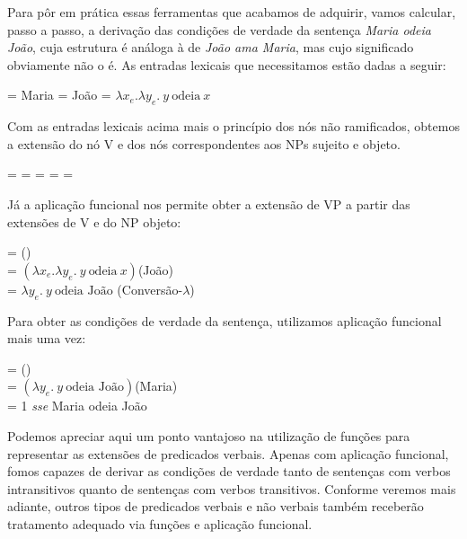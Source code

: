 Para pôr em prática essas ferramentas que acabamos de adquirir, vamos
calcular, passo a passo, a derivação das condições de
verdade da sentença \textit{Maria odeia João}, cuja estrutura é análoga
à de \textit{João ama Maria}, mas cujo significado obviamente não o é.
As entradas lexicais que necessitamos estão dadas a seguir:

\begin{exe}
	\ex 
	\begin{xlist}
		\ex{} = Maria
		\ex {} = João
		\ex {} = $\lambda x_{e}.\lambda y_{e}.\ y\ \text{odeia}\ x$
	\end{xlist}
\end{exe}

\n Com as entradas lexicais acima mais o princípio dos nós não
ramificados, obtemos a extensão do nó V e dos nós correspondentes
aos NPs sujeito e objeto.

\begin{exe}
	\ex 
	\begin{xlist}
		\ex {} = \den{odeia}
		\ex {} = 	 = \den{João}
		\ex {} =  = \den{Maria}
	\end{xlist}
\end{exe}

\n Já a aplicação funcional nos permite obter a extensão de VP a
partir das extensões de V e do NP objeto:

\begin{exe}
	\ex {} = ()\\
	 = $(\lambda x_{e}.\lambda y_{e}.\ y\ \text{odeia}\ x)$(João)\\
	 = $\lambda y_{e}.\ y\ \text{odeia João}$ \hfill (Conversão-$\lambda$)
\end{exe}

\n Para obter as condições de verdade da sentença, utilizamos
aplicação funcional mais uma vez:

\begin{exe}
	\ex {} = (\den{[$_{\text{NP}}$ Maria})\\
	 = $(\lambda y_{e}.\ y\ \text{odeia João})$(Maria)\\
	 = 1 \textit{sse} Maria odeia João
\end{exe}

\n Podemos apreciar aqui um ponto vantajoso na utilização de funções para representar as extensões de predicados verbais. Apenas com aplicação funcional, fomos capazes de derivar as condições de verdade tanto de sentenças com verbos intransitivos quanto de sentenças com verbos transitivos. Conforme veremos mais adiante, outros tipos de predicados verbais e não verbais também receberão tratamento adequado via funções e aplicação funcional.

